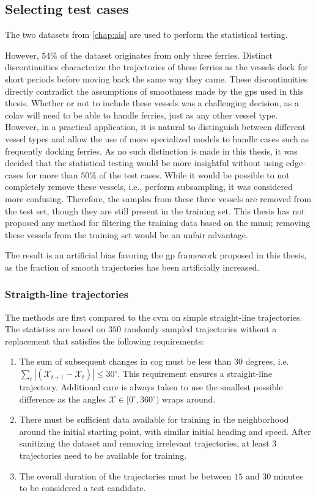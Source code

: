 \subsection{Selecting test cases}
The two datasets from \cref{chap:ais} are used to perform the statistical testing.

However, $54\%$ of the dataset originates from only three ferries. Distinct discontinuities characterize the trajectories of these ferries as the vessels dock for short periods before moving back the same way they came. These discontinuities directly contradict the assumptions of smoothness made by the \acrshort{gp}s used in this thesis. Whether or not to include these vessels was a challenging decision, as a \acrshort{colav} will need to be able to handle ferries, just as any other vessel type. However, in a practical application, it is natural to distinguish between different vessel types and allow the use of more specialized models to handle cases such as frequently docking ferries. As no such distinction is made in this thesis, it was decided that the statistical testing would be more insightful without using edge-cases for more than $50\%$ of the test cases. While it would be possible to not completely remove these vessels, i.e., perform subsampling, it was considered more confusing. Therefore, the samples from these three vessels are removed from the test set, though they are still present in the training set. This thesis has not proposed any method for filtering the training data based on the \acrshort{mmsi}; removing these vessels from the training set would be an unfair advantage.

The result is an artificial bias favoring the \acrshort{gp} framework proposed in this thesis, as the fraction of smooth trajectories has been artificially increased.

\subsubsection{Straigth-line trajectories}
The methods are first compared to the \acrshort{cvm} on simple straight-line trajectories. The statistics are based on $350$ randomly sampled trajectories without a replacement that satisfies the following requirements:
\begin{enumerate}
    \item The sum of subsequent changes in \acrshort{cog} must be less than $30$ degrees, i.e. $\sum_i |(\mathcal{X}_{t+1} - \mathcal{X}_t)| \leq 30^\circ$. This requirement ensures a straight-line trajectory. Additional care is always taken to use the smallest possible difference as the angles $\mathcal{X} \in [0^\circ, 360^\circ)$ wraps around.
    \item There must be sufficient data available for training in the neighborhood around the initial starting point, with similar initial heading and speed. After sanitizing the dataset and removing irrelevant trajectories, at least $3$ trajectories need to be available for training.
    \item The overall duration of the trajectories must be between $15$ and $30$ minutes to be considered a test candidate.
\end{enumerate}

